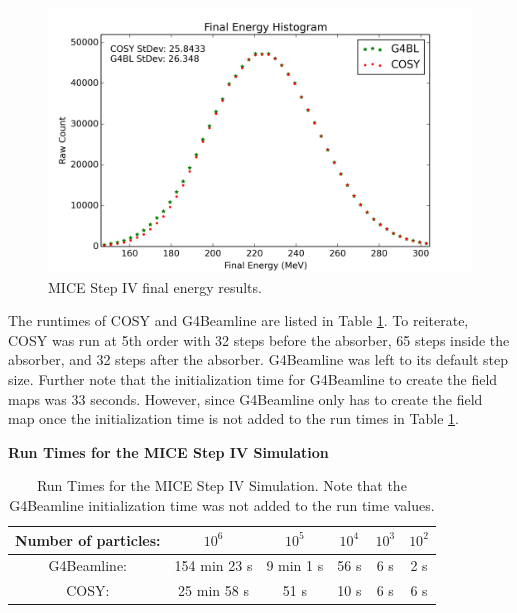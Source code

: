 \begin{figure}[h!]
  \centering
    \includegraphics[width=\textwidth]{MICE data/MICE_1M_energy} 
  \caption{MICE Step IV final energy results.}
  \label{fig:miceenergy}
\end{figure}

The runtimes of COSY and G4Beamline are listed in Table \ref{tbl:mice_times}. To reiterate, COSY was run at 5th order with 32 steps before the absorber, 65 steps inside the absorber, and 32 steps after the absorber. G4Beamline was left to its default step size. Further note that the initialization time for G4Beamline to create the field maps was 33 seconds. However, since G4Beamline only has to create the field map once the initialization time is not added to the run times in Table \ref{tbl:mice_times}.

\begin{table}
\caption*{\textbf{Run Times for the MICE Step IV Simulation}}
\begin{center}
\begin{tabularx}{0.8\textwidth}{cccccc}
\hline \hline
Number of particles: & $10^6$ & $10^5$ & $10^4$ & $10^3$ & $10^2$\\
\hline
G4Beamline: & 154 min 23 s & 9 min 1 s & 56 s & 6 s & 2 s\vspace{-12pt}\\
COSY: & 25 min 58 s & 51 s & 10 s & 6 s & 6 s\\
\hline
\end{tabularx}
\end{center}
\caption[Run Times for the MICE Step IV Simulation.]{Run Times for the MICE Step IV Simulation. Note that the G4Beamline initialization time was not added to the run time values.}
\label{tbl:mice_times}
\end{table}